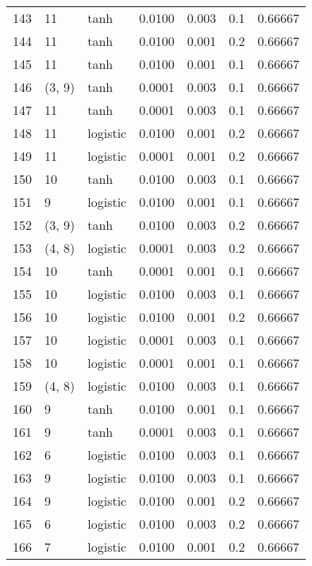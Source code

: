 \begin{tabular}{lllrrrr}
143 &          11 &      tanh &  0.0100 &  0.003 &  0.1 &   0.66667 \\
144 &          11 &      tanh &  0.0100 &  0.001 &  0.2 &   0.66667 \\
145 &          11 &      tanh &  0.0100 &  0.001 &  0.1 &   0.66667 \\
146 &      (3, 9) &      tanh &  0.0001 &  0.003 &  0.1 &   0.66667 \\
147 &          11 &      tanh &  0.0001 &  0.003 &  0.1 &   0.66667 \\
148 &          11 &  logistic &  0.0100 &  0.001 &  0.2 &   0.66667 \\
149 &          11 &  logistic &  0.0001 &  0.001 &  0.2 &   0.66667 \\
150 &          10 &      tanh &  0.0100 &  0.003 &  0.1 &   0.66667 \\
151 &           9 &  logistic &  0.0100 &  0.001 &  0.1 &   0.66667 \\
152 &      (3, 9) &      tanh &  0.0100 &  0.003 &  0.2 &   0.66667 \\
153 &      (4, 8) &  logistic &  0.0001 &  0.003 &  0.2 &   0.66667 \\
154 &          10 &      tanh &  0.0001 &  0.001 &  0.1 &   0.66667 \\
155 &          10 &  logistic &  0.0100 &  0.003 &  0.1 &   0.66667 \\
156 &          10 &  logistic &  0.0100 &  0.001 &  0.2 &   0.66667 \\
157 &          10 &  logistic &  0.0001 &  0.003 &  0.1 &   0.66667 \\
158 &          10 &  logistic &  0.0001 &  0.001 &  0.1 &   0.66667 \\
159 &      (4, 8) &  logistic &  0.0100 &  0.003 &  0.1 &   0.66667 \\
160 &           9 &      tanh &  0.0100 &  0.001 &  0.1 &   0.66667 \\
161 &           9 &      tanh &  0.0001 &  0.003 &  0.1 &   0.66667 \\
162 &           6 &  logistic &  0.0100 &  0.003 &  0.1 &   0.66667 \\
163 &           9 &  logistic &  0.0100 &  0.003 &  0.1 &   0.66667 \\
164 &           9 &  logistic &  0.0100 &  0.001 &  0.2 &   0.66667 \\
165 &           6 &  logistic &  0.0100 &  0.003 &  0.2 &   0.66667 \\
166 &           7 &  logistic &  0.0100 &  0.001 &  0.2 &   0.66667 \\

\end{tabular}

